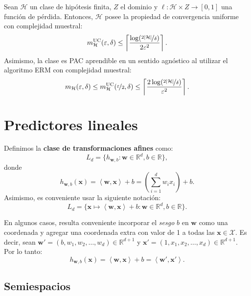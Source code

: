 \documentclass[8pt,a4paper]{extarticle}
\begin{document}
\begin{multicols}{3}
	\begin{boxcor}[]
		Sean $\mathcal{H}$ un clase de hipótesis finita, $Z$ el dominio y  $ \ell : \mathcal{H} \times Z \to [0,1]$ una función de pérdida. Entonces, $\mathcal{H}$ posee la propiedad de convergencia uniforme con complejidad muestral:
		\[
			m_{\mathcal{H}}^{\text{\normalfont UC}} (\varepsilon, \delta) \le \left\lceil \frac{\log(\nicefrac{2\left| \mathcal{H} \right| }{\delta})}{2\varepsilon^2} \right\rceil
			.\]
		Asimismo, la clase es PAC aprendible en un sentido agnóstico al utilizar el algoritmo ERM con complejidad muestral:
		\[
			m_{\mathcal{H}} (\varepsilon, \delta) \le m_{\mathcal{H}}^{\text{\normalfont UC}} (\nicefrac{\varepsilon}{2}, \delta) \le \left\lceil \frac{2\log(\nicefrac{2\left| \mathcal{H} \right| }{\delta})}{\varepsilon^2} \right\rceil
			.\]
	\end{boxcor}

	\newpage

	\section{Predictores lineales}

	\begin{boxdef}
		Definimos la \textbf{clase de transformaciones afines} como:
		\[
			L_{d} = \{ h_{\mathbf{w}, b} : \mathbf{w} \in \mathbb{R}^d, b \in \mathbb{R} \}
			,\]
		donde
		\[
			h_{\mathbf{w}, b} (\mathbf{x}) = \left< \mathbf{w}, \mathbf{x} \right> + b = \left( \sum_{i = 1}^{d} w_i x_i \right) + b
			.\]
		Asimismo, es conveniente usar la siguiente notación:
		\[
			L_{d} = \{ \mathbf{x} \mapsto \left< \mathbf{w}, \mathbf{x} \right> + b : \mathbf{w} \in \mathbb{R}^d, b \in \mathbb{R} \}
			.\]
	\end{boxdef}

	\begin{boxrmk}[]
		En algunos casos, resulta conveniente incorporar el \emph{sesgo} $b$ en  $ \mathbf{w}$ como una coordenada y agregar una coordenada extra con valor de 1 a todas las $ \mathbf{x}  \in \mathcal{X}$. Es decir, sean $ \mathbf{w}' = (b, w_1, w_2, \ldots, w_d) \in \mathbb{R}^{d + 1}$ y $ \mathbf{x}' = (1, x_1, x_2, \ldots, x_d) \in \mathbb{R}^{d + 1}$. Por lo tanto:
		\[
			h_{\mathbf{w}, b} (\mathbf{x}) = \left< \mathbf{w}, \mathbf{x} \right> + b = \left< \mathbf{w}', \mathbf{x}' \right>
			.\]
	\end{boxrmk}

	\subsection{Semiespacios}


\end{multicols}
\end{document}
